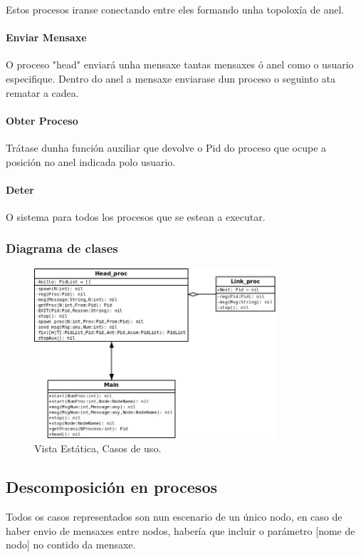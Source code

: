 \documentclass[DIV=calc,paper=a4,fontsize=11pt,onecolumn]{scrartcl}	 %
\begin{document}
Estos procesos iranse conectando entre eles formando unha topoloxía de anel.
\paragraph{Enviar Mensaxe}
O proceso "head" enviará unha mensaxe tantas mensaxes ó anel como o usuario especifique. Dentro do anel a mensaxe enviarase dun proceso o seguinto ata rematar a cadea.
\paragraph{Obter Proceso}
Trátase dunha función auxiliar que devolve o Pid do proceso que ocupe a posición no anel indicada polo usuario.
\paragraph{Deter}
O sistema para todos los procesos que se estean a executar.
\newpage
\subsubsection{Diagrama de clases}

\begin{figure}[h]
\centering
\includegraphics[width=0.8\textwidth]{./figuras/Diagrama2.jpeg}
\caption{Vista Estática, Casos de uso.}
\label{fig:anelEstCU}
\end{figure}

\subsection{Descomposición en procesos}


Todos os casos representados son nun escenario de un único nodo, en caso de haber envio de mensaxes entre nodos, habería que incluir o parámetro [nome de nodo] no contido da mensaxe.
\newpage
\end{document}
